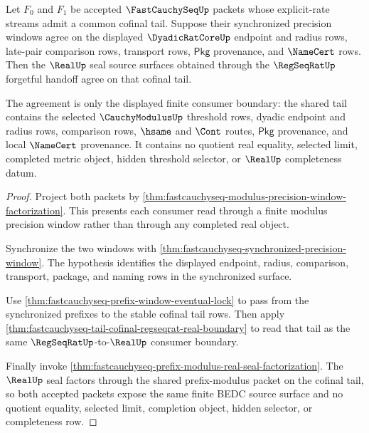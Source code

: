 \begin{theorem}
\label{thm:fastcauchyseq-cofinal-tail-real-seal-coherence}
Let $F_0$ and $F_1$ be accepted $\FastCauchySeqUp$ packets whose
explicit-rate streams admit a common cofinal tail. Suppose their synchronized
precision windows agree on the displayed $\DyadicRatCoreUp$ endpoint and
radius rows, late-pair comparison rows, transport rows, $\mathsf{Pkg}$
provenance, and $\NameCert$ rows. Then the $\RealUp$ seal source surfaces
obtained through the $\RegSeqRatUp$ forgetful handoff agree on that cofinal
tail.

The agreement is only the displayed finite consumer boundary: the shared tail
contains the selected $\CauchyModulusUp$ threshold rows, dyadic endpoint and
radius rows, comparison rows, $\hsame$ and $\Cont$ routes, $\mathsf{Pkg}$
provenance, and local $\NameCert$ provenance. It contains no quotient real
equality, selected limit, completed metric object, hidden threshold selector,
or $\RealUp$ completeness datum.
\end{theorem}
\begin{proof}
Project both packets by
\autoref{thm:fastcauchyseq-modulus-precision-window-factorization}. This
presents each consumer read through a finite modulus precision window rather
than through any completed real object.

Synchronize the two windows with
\autoref{thm:fastcauchyseq-synchronized-precision-window}. The hypothesis
identifies the displayed endpoint, radius, comparison, transport, package, and
naming rows in the synchronized surface.

Use \autoref{thm:fastcauchyseq-prefix-window-eventual-lock} to pass from the
synchronized prefixes to the stable cofinal tail rows. Then apply
\autoref{thm:fastcauchyseq-tail-cofinal-regseqrat-real-boundary} to read that
tail as the same $\RegSeqRatUp$-to-$\RealUp$ consumer boundary.

Finally invoke
\autoref{thm:fastcauchyseq-prefix-modulus-real-seal-factorization}. The
$\RealUp$ seal factors through the shared prefix-modulus packet on the cofinal
tail, so both accepted packets expose the same finite BEDC source surface and
no quotient equality, selected limit, completion object, hidden selector, or
completeness row.
\end{proof}


